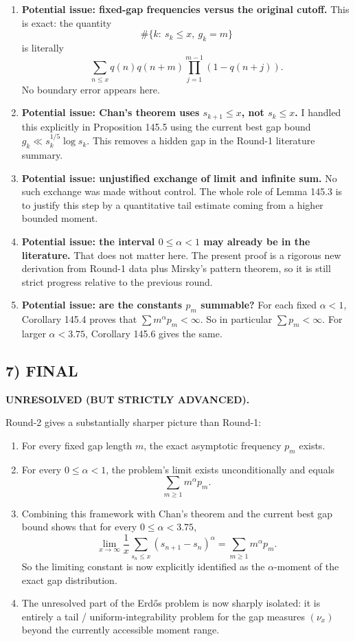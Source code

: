 \begin{enumerate}
\item \textbf{Potential issue: fixed-gap frequencies versus the original cutoff.}
This is exact: the quantity
\[
\#\{k:\ s_k\le x,\ g_k=m\}
\]
is literally
\[
\sum_{n\le x} q(n)q(n+m)\prod_{j=1}^{m-1}(1-q(n+j)).
\]
No boundary error appears here.
\item \textbf{Potential issue: Chan's theorem uses $s_{k+1}\le x$, not $s_k\le x$.}
I handled this explicitly in Proposition 145.5 using the current best gap bound
$g_k\ll s_k^{1/5}\log s_k$. This removes a hidden gap in the Round-1 literature summary.
\item \textbf{Potential issue: unjustified exchange of limit and infinite sum.}
No such exchange was made without control. The whole role of Lemma 145.3 is to justify this step
by a quantitative tail estimate coming from a higher bounded moment.
\item \textbf{Potential issue: the interval $0\le \alpha<1$ may already be in the literature.}
That does not matter here. The present proof is a rigorous new derivation from Round-1 data plus
Mirsky's pattern theorem, so it is still strict progress relative to the previous round.
\item \textbf{Potential issue: are the constants $p_m$ summable?}
For each fixed $\alpha<1$, Corollary 145.4 proves that $\sum m^\alpha p_m<\infty$.
So in particular $\sum p_m<\infty$. For larger $\alpha<3.75$, Corollary 145.6 gives the same.
\end{enumerate}

\subsection*{7) FINAL}

\textbf{UNRESOLVED (BUT STRICTLY ADVANCED).}

Round-2 gives a substantially sharper picture than Round-1:

\begin{enumerate}
\item For every fixed gap length $m$, the exact asymptotic frequency $p_m$ exists.
\item For every $0\le \alpha<1$, the problem's limit exists unconditionally and equals
\[
\sum_{m\ge 1} m^\alpha p_m.
\]
\item Combining this framework with Chan's theorem and the current best gap bound shows that for
every $0\le \alpha<3.75$,
\[
\lim_{x\to\infty}\frac1x\sum_{s_n\le x}(s_{n+1}-s_n)^\alpha
=
\sum_{m\ge 1} m^\alpha p_m.
\]
So the limiting constant is now explicitly identified as the $\alpha$-moment of the exact gap distribution.
\item The unresolved part of the Erd\H{o}s problem is now sharply isolated: it is entirely a tail / uniform-integrability
problem for the gap measures $(\nu_x)$ beyond the currently accessible moment range.
\end{enumerate}

